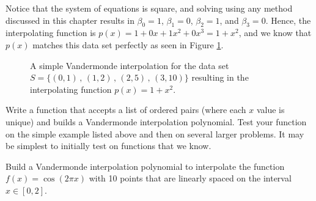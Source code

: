 Notice that the system of equations is square, and solving using any method discussed in
this chapter results in $\beta_0 = 1$, $\beta_1 = 0$, $\beta_2 = 1$, and $\beta_3 = 0$.
Hence, the interpolating function is $p(x) = 1 + 0x + 1x^2 + 0x^3 = 1+x^2$, and we know
that $p(x)$ matches this data set perfectly as seen in Figure \ref{fig:vandermonde}.

\begin{figure}[ht!]
    \begin{center}
    \end{center}
    \caption{A simple Vandermonde interpolation for the data set $S = \{(0,1) \, , \,
(1,2) \, , \, (2,5) \, , \, (3,10) \}$ resulting in the interpolating function $p(x) =
1+x^2$.}
    \label{fig:vandermonde}
\end{figure}


\begin{problem}\label{prob:vandermonde_1}
   Write a \ProgLang function that accepts a list of ordered pairs (where each $x$ value is
   unique) and builds a Vandermonde interpolation polynomial.  Test your function on the
   simple example listed above and then on several larger problems.  It may be simplest to
   initially test on functions that we know.
\end{problem}

\begin{problem}
    Build a Vandermonde interpolation polynomial to interpolate the function $f(x) =
    \cos(2 \pi x)$ with 10 points that are linearly spaced on the interval $x \in [0,2]$.
\end{problem}

